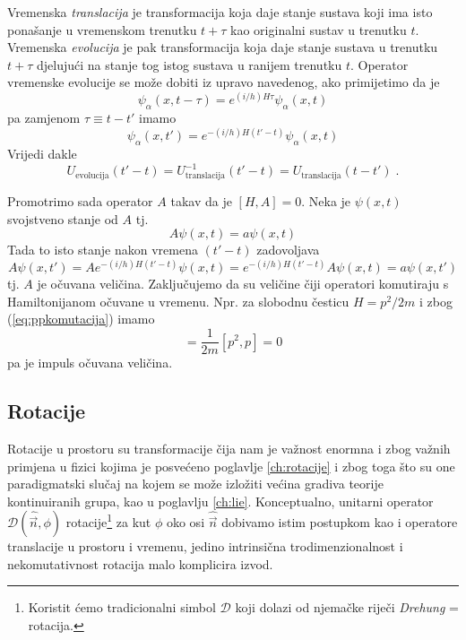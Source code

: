 Vremenska \emph{translacija} je transformacija koja daje
stanje sustava koji ima isto ponašanje u vremenskom
trenutku $t+\tau$ kao originalni sustav u trenutku $t$. Vremenska
\emph{evolucija} je pak transformacija koja 
daje stanje sustava u trenutku $t+\tau$ djelujući na stanje
tog istog sustava u ranijem trenutku $t$.
Operator vremenske evolucije se može dobiti iz upravo
navedenog, ako primijetimo da je
\begin{equation}
\psi_{\alpha}(x,t-\tau)=e^{(i/h)H\tau}\psi_{\alpha}(x,t)
\end{equation}
pa zamjenom $\tau\equiv t-t'$ imamo 
\begin{equation}
\psi_{\alpha}(x,t')=e^{-(i/h)H(t'-t)}\psi_{\alpha}(x,t)
\end{equation}
Vrijedi dakle
\begin{equation}
U_{\text{evolucija}}(t' -t)=U^{-1}_{\text{translacija}}(t' -t)
=U_{\text{translacija}}(t -t') \;.
\end{equation}

Promotrimo sada operator $A$ takav da je
$[H,A]=0$. Neka je $\psi(x,t)$ svojstveno stanje od $A$ tj.
\begin{equation}
  A\psi(x,t) = a \psi(x,t)
\end{equation}
Tada to isto stanje nakon vremena $(t'-t)$ zadovoljava
\begin{equation}
  A\psi(x,t')= A e^{-(i/h)H(t'-t)} \psi(x,t) =
 e^{-(i/h)H(t'-t)} A \psi(x,t) = a \psi(x,t')
\end{equation}
tj. $A$ je očuvana veličina. Zaključujemo da su
veličine čiji operatori komutiraju s Hamiltonijanom očuvane u vremenu.
Npr. za slobodnu česticu $H=p^2/2m$ i zbog (\ref{eq:ppkomutacija}) imamo
\begin{equation}
   [H,p]=\frac{1}{2m}[p^2,p]=0
\end{equation}
pa je impuls očuvana veličina.



\subsection{Rotacije}

Rotacije u prostoru su transformacije čija nam je važnost
enormna i zbog važnih primjena u fizici kojima je posvećeno
poglavlje \ref{ch:rotacije} i zbog toga što su one paradigmatski
slučaj na kojem se može izložiti većina gradiva teorije kontinuiranih grupa,
kao u poglavlju \ref{ch:lie}.
Konceptualno, unitarni operator $\mathcal{D}(\hat{\vec{n}}, \phi)$
rotacije\footnote{Koristit ćemo
  tradicionalni simbol $\mathcal{D}$ koji dolazi od njemačke
riječi \emph{Drehung} = rotacija.} za kut $\phi$ oko osi $\hat{\vec{n}}$ dobivamo
istim postupkom kao i operatore translacije u prostoru i vremenu,
jedino intrinsična trodimenzionalnost i nekomutativnost rotacija
malo komplicira izvod.


